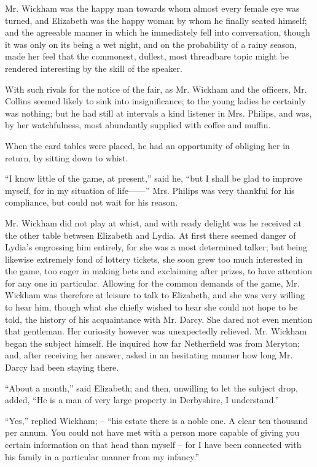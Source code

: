 Mr. Wickham was the happy man towards whom almost
every female eye was turned, and Elizabeth was the
happy woman by whom he finally seated himself; and
the agreeable manner in which he immediately fell into
conversation, though it was only on its being a wet night,
and on the probability of a rainy season, made her feel
that the commonest, dullest, most threadbare topic might
be rendered interesting by the skill of the speaker.

With such rivals for the notice of the fair, as Mr. Wickham
and the officers, Mr. Collins seemed likely to sink
into insignificance; to the young ladies he certainly was
nothing; but he had still at intervals a kind listener in
Mrs. Philips, and was, by her watchfulness, most abundantly
supplied with coffee and muffin.

When the card tables were placed, he had an opportunity
of obliging her in return, by sitting down to whist.

“I know little of the game, at present,” said he, “but
I shall be glad to improve myself, for in my situation of
life------” Mrs. Philips was very thankful for his compliance,
but could not wait for his reason.

Mr. Wickham did not play at whist, and with ready
delight was he received at the other table between Elizabeth
and Lydia. At first there seemed danger of Lydia’s
engrossing him entirely, for she was a most determined
talker; but being likewise extremely fond of lottery
tickets, she soon grew too much interested in the game,
too eager in making bets and exclaiming after prizes, to
have attention for any one in particular. Allowing for
the common demands of the game, Mr. Wickham was
therefore at leisure to talk to Elizabeth, and she was very
willing to hear him, though what she chiefly wished to
hear she could not hope to be told, the history of his
acquaintance with Mr. Darcy. She dared not even
mention that gentleman. Her curiosity however was
unexpectedly relieved. Mr. Wickham began the subject
himself. He inquired how far Netherfield was from
Meryton; and, after receiving her answer, asked in an
hesitating manner how long Mr. Darcy had been staying
there.

“About a month,” said Elizabeth; and then, unwilling
to let the subject drop, added, “He is a man of very large
property in Derbyshire, I understand.”

“Yes,” replied Wickham; -- “his estate there is a noble
one. A clear ten thousand per annum. You could not
have met with a person more capable of giving you certain
information on that head than myself -- for I have been
connected with his family in a particular manner from my
infancy.”

